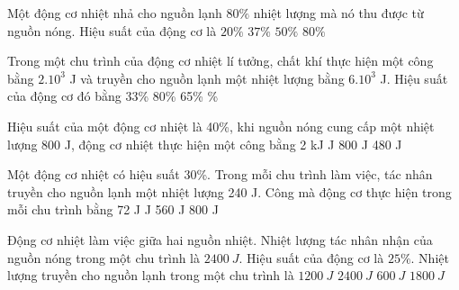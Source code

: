 \begin{vidu}
	Một động cơ nhiệt nhả cho nguồn lạnh $80 \%$ nhiệt lượng mà nó thu được từ nguồn nóng. Hiệu suất của động cơ là
	\choice
	{\True $20 \%$}
	{$37 \%$}
	{$50 \%$}
	{$80 \%$}
	\end{vidu}
\begin{vidu}%
	Trong một chu trình của động cơ nhiệt lí tưởng, chất khí thực hiện một công bằng $2.10^{3}$ J và truyền cho nguồn lạnh một nhiệt lượng bằng $6.10^{3}$ J. Hiệu suất của động cơ đó bằng
	\choice
	{33\%}
	{80\%}
	{65\%}
	{\%}
	\end{vidu}
\begin{vidu}%
	Hiệu suất của một động cơ nhiệt là 40\%, khi nguồn nóng cung cấp một nhiệt lượng 800 J, động cơ nhiệt thực hiện một công bằng
	\choice
	{2 kJ}
	{ J}
	{800 J}
	{480 J}
	\end{vidu}
\begin{vidu}%
	Một động cơ nhiệt có hiệu suất 30\%. Trong mỗi chu trình làm việc, tác nhân truyền cho nguồn lạnh một nhiệt lượng 240 J. Công mà động cơ thực hiện trong mỗi chu trình bằng
	\choice
	{72 J}
	{ J}
	{560 J}
	{800 J}
	\end{vidu}
\begin{vidu}
	Động cơ nhiệt làm việc giữa hai nguồn nhiệt. Nhiệt lượng tác nhân nhận của nguồn nóng trong một chu trình là $2400\ J$. Hiệu suất của động cơ là $25 \%$. Nhiệt lượng truyền cho nguồn lạnh trong một chu trình là
	\choice
	{$1200\ J$}
	{$2400\ J$}
	{$600\ J$}
	{\True $1800\ J$}
	
	\end{vidu}